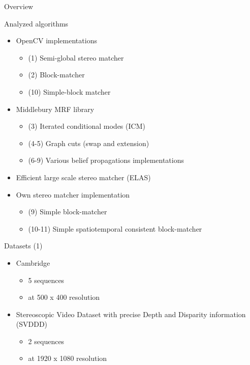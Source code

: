 \documentclass[10pt]{beamer}
\begin{document}
\begin{frame}[fragile]{Overview}
  \begin{block}{Analyzed algorithms}
    \begin{itemize}
      \item OpenCV implementations
      \begin{itemize}
        \item (1) Semi-global stereo matcher
        \item (2) Block-matcher
        \item (10) Simple-block matcher
      \end{itemize}
      \item Middlebury MRF library
      \begin{itemize}
        \item (3) Iterated conditional modes (ICM)
        \item (4-5) Graph cuts (swap and extension)
        \item (6-9) Various belief propagations implementations
      \end{itemize}
      \item Efficient large scale stereo matcher (ELAS)
      \item Own stereo matcher implementation
      \begin{itemize}
        \item (9) Simple block-matcher
        \item (10-11) Simple spatiotemporal consistent block-matcher
      \end{itemize}
    \end{itemize}
  \end{block}
\end{frame}

\begin{frame}[fragile]{Datasets (1)}
  \begin{itemize}
    \item Cambridge
    \begin{itemize}
      \item 5 sequences
      \item at 500 x 400 resolution
    \end{itemize}
    \item Stereoscopic Video Dataset with precise Depth and Disparity information (SVDDD)
    \begin{itemize}
      \item 2 sequences
      \item at 1920 x 1080 resolution
    \end{itemize}
  \end{itemize}
\end{frame}
\end{document}
